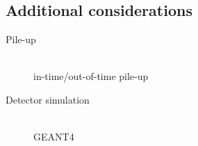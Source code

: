 \subsection{Additional considerations}
\begin{description}
\item[Pile-up] \hfill \\
	in-time/out-of-time pile-up
\item[Detector simulation] \hfill \\
	GEANT4
\end{description}